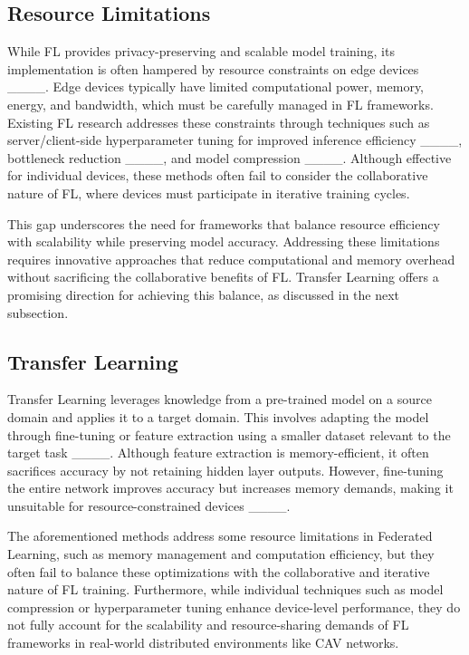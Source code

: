 \subsection{Resource Limitations}
While FL provides privacy-preserving and scalable model training, its implementation is often hampered by resource constraints on edge devices ____. Edge devices typically have limited computational power, memory, energy, and bandwidth,  which must be carefully managed in FL frameworks. Existing FL research addresses these constraints through techniques such as server/client-side hyperparameter tuning for improved inference efficiency ____, bottleneck reduction ____, and model compression ____. Although effective for individual devices, these methods often fail to consider the collaborative nature of FL, where devices must participate in iterative training cycles.

This gap underscores the need for frameworks that balance resource efficiency with scalability while preserving model accuracy. Addressing these limitations requires innovative approaches that reduce computational and memory overhead without sacrificing the collaborative benefits of FL. Transfer Learning offers a promising direction for achieving this balance, as discussed in the next subsection.

\subsection{Transfer Learning}
Transfer Learning leverages knowledge from a pre-trained model on a source domain and applies it to a target domain. This involves adapting the model through fine-tuning or feature extraction using a smaller dataset relevant to the target task ____. Although feature extraction is memory-efficient, it often sacrifices accuracy by not retaining hidden layer outputs. However, fine-tuning the entire network improves accuracy but increases memory demands, making it unsuitable for resource-constrained devices ____.

The aforementioned methods address some resource limitations in Federated Learning, such as memory management and computation efficiency, but they often fail to balance these optimizations with the collaborative and iterative nature of FL training. Furthermore, while individual techniques such as model compression or hyperparameter tuning enhance device-level performance, they do not fully account for the scalability and resource-sharing demands of FL frameworks in real-world distributed environments like CAV networks.